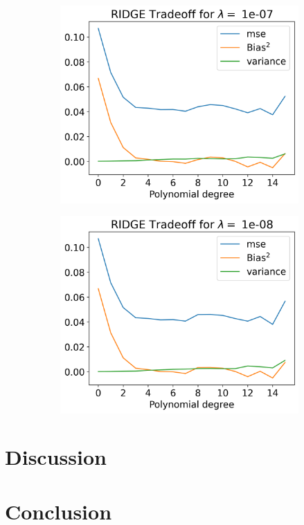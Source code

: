 \documentclass[12pt]{article}
\begin{document}
\begin{figure}[H]
  \begin{subfigure}{.5\textwidth}
    \centering
    \includegraphics[width=\textwidth]{../figures/tradeoff_RIDGE_1e-07.png}
    \caption{}
    \label{fig:}
  \end{subfigure}
  \begin{subfigure}{.5\textwidth}
    \centering
    \includegraphics[width=\textwidth]{../figures/tradeoff_RIDGE_1e-08.png}
    \caption{}
    \label{fig:}
  \end{subfigure}
  \caption{}
  \label{fig:ridge_}
\end{figure}
\section{Discussion}
\section{Conclusion}

\section{}
\end{document}

